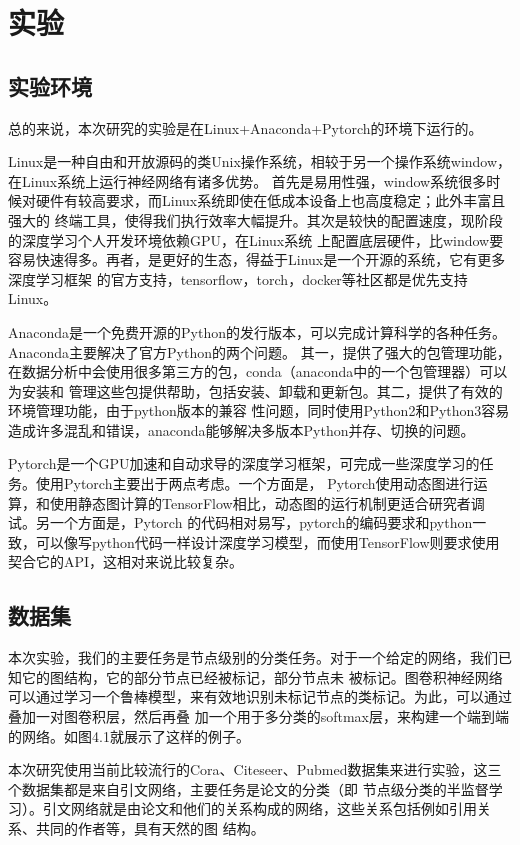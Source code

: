 \cleardoublepage

\section{实验}
\subsection{实验环境}
总的来说，本次研究的实验是在Linux+Anaconda+Pytorch的环境下运行的。

Linux是一种自由和开放源码的类Unix操作系统，相较于另一个操作系统window，在Linux系统上运行神经网络有诸多优势。
首先是易用性强，window系统很多时候对硬件有较高要求，而Linux系统即使在低成本设备上也高度稳定；此外丰富且强大的
终端工具，使得我们执行效率大幅提升。其次是较快的配置速度，现阶段的深度学习个人开发环境依赖GPU，在Linux系统
上配置底层硬件，比window要容易快速得多。再者，是更好的生态，得益于Linux是一个开源的系统，它有更多深度学习框架
的官方支持，tensorflow，torch，docker等社区都是优先支持Linux。

Anaconda是一个免费开源的Python的发行版本，可以完成计算科学的各种任务。Anaconda主要解决了官方Python的两个问题。
其一，提供了强大的包管理功能，在数据分析中会使用很多第三方的包，conda（anaconda中的一个包管理器）可以为安装和
管理这些包提供帮助，包括安装、卸载和更新包。其二，提供了有效的环境管理功能，由于python版本的兼容
性问题，同时使用Python2和Python3容易造成许多混乱和错误，anaconda能够解决多版本Python并存、切换的问题。

Pytorch是一个GPU加速和自动求导的深度学习框架，可完成一些深度学习的任务。使用Pytorch主要出于两点考虑。一个方面是，
Pytorch使用动态图进行运算，和使用静态图计算的TensorFlow相比，动态图的运行机制更适合研究者调试。另一个方面是，Pytorch
的代码相对易写，pytorch的编码要求和python一致，可以像写python代码一样设计深度学习模型，而使用TensorFlow则要求使用
契合它的API，这相对来说比较复杂。

\subsection{数据集}
本次实验，我们的主要任务是节点级别的分类任务。对于一个给定的网络，我们已知它的图结构，它的部分节点已经被标记，部分节点未
被标记。图卷积神经网络可以通过学习一个鲁棒模型，来有效地识别未标记节点的类标记。为此，可以通过叠加一对图卷积层，然后再叠
加一个用于多分类的softmax层，来构建一个端到端的网络。如图4.1就展示了这样的例子。

本次研究使用当前比较流行的Cora、Citeseer、Pubmed数据集来进行实验，这三个数据集都是来自引文网络，主要任务是论文的分类（即
节点级分类的半监督学习）。引文网络就是由论文和他们的关系构成的网络，这些关系包括例如引用关系、共同的作者等，具有天然的图
结构。

